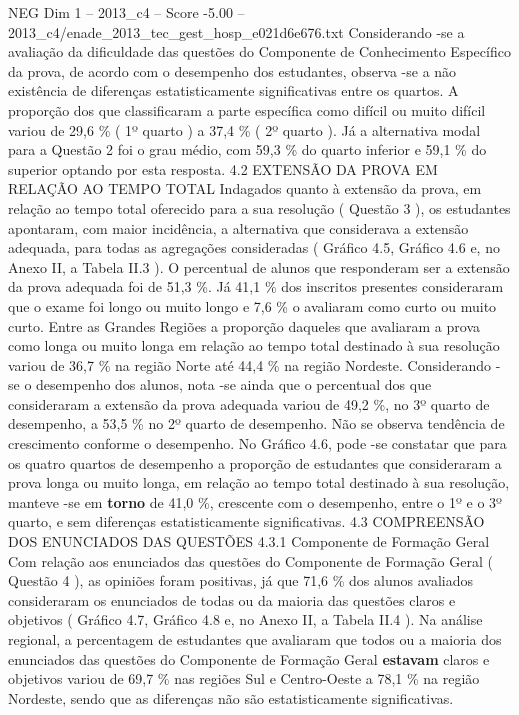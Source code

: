 \begin{textsample}{NEG Dim 1 – 2013\_c4 – Score -5.00 – 2013\_c4/enade\_2013\_tec\_gest\_hosp\_e021d6e676.txt}
Considerando -se a avaliação da dificuldade das questões do Componente de Conhecimento Específico da prova, de acordo com o desempenho dos estudantes, observa -se a não existência de diferenças estatisticamente significativas entre os quartos.
A proporção dos que classificaram a parte específica como difícil ou muito difícil variou de 29,6 \% ( 1º quarto ) a 37,4 \% ( 2º quarto ).
Já a alternativa modal para a Questão 2 foi o grau médio, com 59,3 \% do quarto inferior e 59,1 \% do superior optando por esta resposta. 4.2 EXTENSÃO DA PROVA EM RELAÇÃO AO TEMPO TOTAL Indagados quanto à extensão da prova, em relação ao tempo total oferecido para a sua resolução ( Questão 3 ), os estudantes apontaram, com maior incidência, a alternativa que considerava a extensão adequada, para todas as agregações consideradas ( Gráfico 4.5, Gráfico 4.6 e, no Anexo II, a Tabela II.3 ).
O percentual de alunos que responderam ser a extensão da prova adequada foi de 51,3 \%.
Já 41,1 \% dos inscritos presentes consideraram que o exame foi longo ou muito longo e 7,6 \% o avaliaram como curto ou muito curto.
Entre as Grandes Regiões a proporção daqueles que avaliaram a prova como longa ou muito longa em relação ao tempo total destinado à sua resolução variou de 36,7 \% na região Norte até 44,4 \% na região Nordeste.
Considerando -se o desempenho dos alunos, nota -se ainda que o percentual dos que consideraram a extensão da prova adequada variou de 49,2 \%, no 3º quarto de desempenho, a 53,5 \% no 2º quarto de desempenho.
Não se observa tendência de crescimento conforme o desempenho.
No Gráfico 4.6, pode -se constatar que para os quatro quartos de desempenho a proporção de estudantes que consideraram a prova longa ou muito longa, em relação ao tempo total destinado à sua resolução, manteve -se em \textbf{torno} de 41,0 \%, crescente com o desempenho, entre o 1º e o 3º quarto, e sem diferenças estatisticamente significativas. 4.3 COMPREENSÃO DOS ENUNCIADOS DAS QUESTÕES 4.3.1 Componente de Formação Geral Com relação aos enunciados das questões do Componente de Formação Geral ( Questão 4 ), as opiniões foram positivas, já que 71,6 \% dos alunos avaliados consideraram os enunciados de todas ou da maioria das questões claros e objetivos ( Gráfico 4.7, Gráfico 4.8 e, no Anexo II, a Tabela II.4 ).
Na análise regional, a percentagem de estudantes que avaliaram que todos ou a maioria dos enunciados das questões do Componente de Formação Geral \textbf{estavam} claros e objetivos variou de 69,7 \% nas regiões Sul e Centro-Oeste a 78,1 \% na região Nordeste, sendo que as diferenças não são estatisticamente significativas.

\end{textsample}
